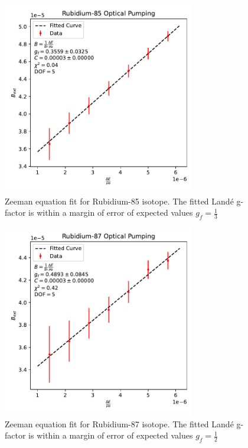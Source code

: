 \documentclass[12pt, letterpaper]{article}
\begin{document}
\begin{figure}[!h]
    \centering
    \includegraphics[width=0.75\textwidth]{experiment4/figures/rb85.pdf}
    \caption{Zeeman equation fit for Rubidium-85 isotope. The fitted Landé g-factor is within a margin of error of expected values $g_f = \frac{1}{3}$}
    \label{fig:rb85}
\end{figure}

\begin{figure}[!h]
    \centering
    \includegraphics[width=0.75\textwidth]{experiment4/figures/rb87.pdf}
    \caption{Zeeman equation fit for Rubidium-87 isotope. The fitted Landé g-factor is within a margin of error of expected values $g_f = \frac{1}{2}$}
    \label{fig:rb87}
\end{figure}
\end{document}
